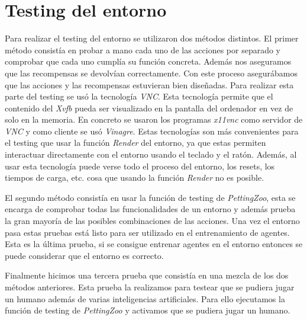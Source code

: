 \section{Testing del entorno}

Para realizar el testing del entorno se utilizaron dos métodos distintos. El primer método consistía en probar a mano cada uno de las acciones por separado y comprobar que cada uno cumplía su función concreta. Además nos aseguramos que las recompensas se devolvían correctamente. Con este proceso asegurábamos que las acciones y las recompensas estuvieran bien diseñadas. Para realizar esta parte del testing se usó la tecnología \textit{VNC}. Esta tecnología permite que el contenido del \textit{Xvfb} pueda ser visualizado en la pantalla del ordenador en vez de solo en la memoria. En concreto se usaron los programas \textit{x11vnc} como servidor de \textit{VNC} y como cliente se usó \textit{Vinagre}. Estas tecnologías son más convenientes para el testing que usar la función \textit{Render} del entorno, ya que estas permiten interactuar directamente con el entorno usando el teclado y el ratón. Además, al usar esta tecnología puede verse todo el proceso del entorno, los resets, los tiempos de carga, etc. cosa que usando la función \textit{Render} no es  posible.

El segundo método consistía en usar la función de testing de \textit{PettingZoo}, esta se encarga de comprobar todas las funcionalidades de un entorno y además prueba la gran mayoría de las posibles combinaciones de las acciones. Una vez el entorno pasa estas pruebas está listo para ser utilizado en el entrenamiento de agentes. Esta es la última prueba, si se consigue entrenar agentes en el entorno entonces se puede considerar que el entorno es correcto.

Finalmente hicimos una tercera prueba que consistía en una mezcla de los dos métodos anteriores. Esta prueba la realizamos para testear que se pudiera jugar un humano además de varias inteligencias artificiales. Para ello ejecutamos la función de testing de \textit{PettingZoo} y activamos que se pudiera jugar un humano.
